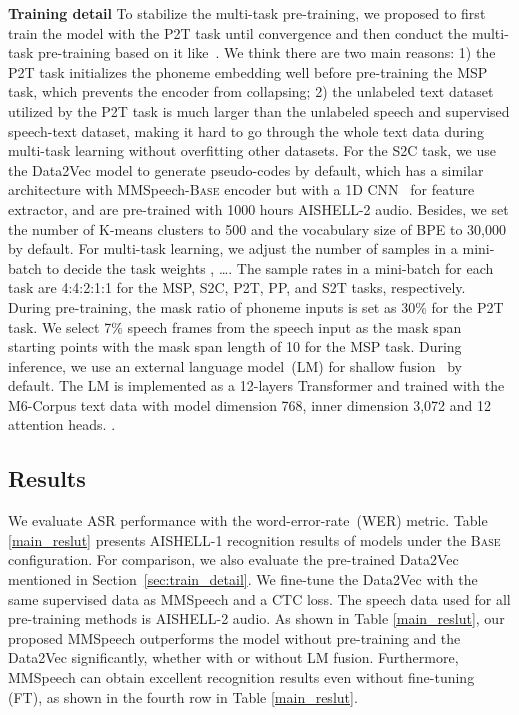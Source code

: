 \documentclass{article}
\begin{document}
\noindent
\textbf{Training detail}
\label{sec:train_detail}
To stabilize the multi-task pre-training, we proposed to first train the model with the P2T task until convergence and then conduct the multi-task pre-training based on it like~\cite{tang2022unified}. 
We think there are two main reasons: 
1) the P2T task initializes the phoneme embedding  well before pre-training the MSP task, which prevents the encoder from collapsing; 
2) the unlabeled text dataset utilized by the P2T task is much larger than the unlabeled speech and supervised speech-text dataset, making it hard to go through the whole text data during multi-task learning without overfitting other datasets.
For the S2C task, we use the Data2Vec model to generate pseudo-codes by default, which has a similar architecture with MMSpeech-\textsc{Base} encoder but with a 1D CNN~\cite{wang2020fairseqs2t} for feature extractor, and are pre-trained with 1000 hours AISHELL-2 audio. Besides, we set the number of K-means clusters to 500 and the vocabulary size of BPE to 30,000 by default.
For multi-task learning, we adjust the number of samples in a mini-batch to decide the task weights , \ldots . The sample rates in a mini-batch for each task are 4:4:2:1:1 for the MSP, S2C, P2T, PP, and S2T tasks, respectively. 
During pre-training, the mask ratio of phoneme inputs is set as 30\% for the P2T task. We select 7\% speech frames from the speech input as the mask span starting points with the mask span length of 10 for the MSP task. 
During inference, we use an external language model~(LM) for shallow fusion~\cite{gulcehre2015using} by default. The LM is implemented as a 12-layers Transformer and trained with the M6-Corpus text data with model dimension 768, inner dimension 3,072 and 12 attention heads. .

\subsection{Results}
We evaluate ASR performance with the word-error-rate~(WER) metric. Table \ref{main_reslut} presents AISHELL-1 recognition results of models under the \textsc{Base} configuration. For comparison, we also evaluate the pre-trained Data2Vec mentioned in Section~\ref{sec:train_detail}. We fine-tune the Data2Vec with the same supervised data as MMSpeech and a CTC loss. The speech data used for all pre-training methods is AISHELL-2 audio. As shown in Table \ref{main_reslut}, our proposed MMSpeech outperforms the model without pre-training and the Data2Vec significantly, whether with or without LM fusion. Furthermore, MMSpeech can obtain excellent recognition results even without fine-tuning (FT), as shown in the fourth row in Table \ref{main_reslut}. 
\end{document}
